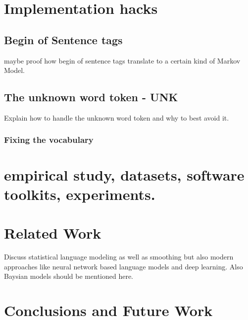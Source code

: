 \documentclass[•]{book}
\begin{document}
\chapter{Implementation hacks}
\section{Begin of Sentence tags}
maybe proof how begin of sentence tags translate to a certain kind of Markov Model. 
\section{The unknown word token - UNK}
Explain how to handle the unknown word token and why to best avoid it. 
\subsection{Fixing the vocabulary}

\chapter{empirical study, datasets, software toolkits, experiments.} 


\chapter{Related Work}
Discuss statistical language modeling as well as smoothing but also modern approaches like neural network based language models and deep learning. Also Baysian models should be mentioned here.

\chapter{Conclusions and Future Work}
\end{document}
